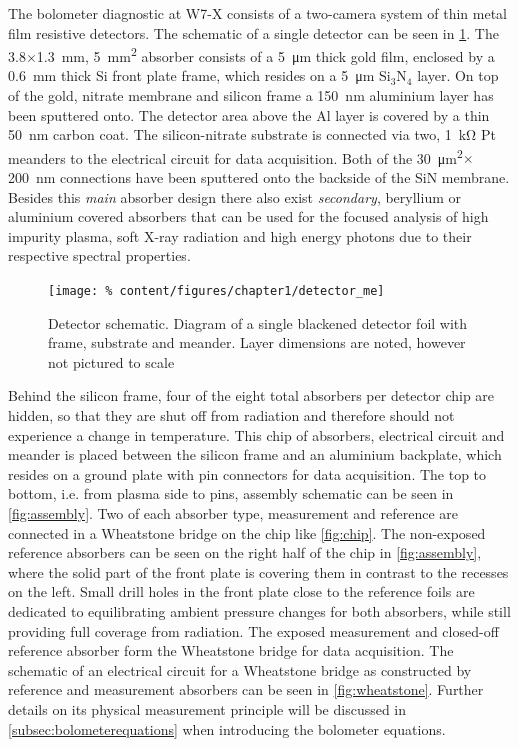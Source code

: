             The bolometer diagnostic at W7-X consists of a two-camera system of thin metal film resistive detectors. The schematic of a single detector can be seen in \cref{fig:detector_me}. The 3.8$\times$\SI{1.3}{\milli\meter}, \SI{5}{\milli\meter\squared} absorber consists of a \mbox{\SI{5}{\micro\meter}} thick gold film, enclosed by a \mbox{\SI{0.6}{\milli\meter}} thick Si front plate frame, which resides on a \mbox{\SI{5}{\micro\meter}} Si$_{3}$N$_{4}$ layer. On top of the gold, nitrate membrane and silicon frame a \mbox{\SI{150}{\nano\meter}} aluminium layer has been sputtered onto. The detector area above the Al layer is covered by a thin \mbox{\SI{50}{\nano\meter}} carbon coat. The silicon-nitrate substrate is connected via two, \mbox{\SI{1}{\kilo\ohm}} Pt meanders to the electrical circuit for data acquisition. Both of the \mbox{\SI{30}{\micro\meter\squared}$\times$\SI{200}{\nano\meter}} connections have been sputtered onto the backside of the SiN membrane. Besides this \textit{main} absorber design there also exist \textit{secondary}, beryllium or aluminium covered absorbers that can be used for the focused analysis of high impurity plasma, soft X-ray radiation and high energy photons due to their respective spectral properties.\\%
%
            \begin{figure}[t]%
                \centering%
                \texttt{[image: \%
                    content/figures/chapter1/detector\_me]}%
                \caption{%
                    Detector schematic. Diagram of a single blackened detector foil with frame, substrate and meander. Layer dimensions are noted, however not pictured to scale}\label{fig:detector_me}%
            \end{figure}%
%
            Behind the silicon frame, four of the eight total absorbers per detector chip are hidden, so that they are shut off from radiation and therefore should not experience a change in temperature. This chip of absorbers, electrical circuit and meander is placed between the silicon frame and an aluminium backplate, which resides on a ground plate with pin connectors for data acquisition. The top to bottom, i.e. from plasma side to pins, assembly schematic can be seen in \cref{fig:assembly}. Two of each absorber type, measurement and reference are connected in a Wheatstone bridge on the chip like \cref{fig:chip}. The non-exposed reference absorbers can be seen on the right half of the chip in \cref{fig:assembly}, where the solid part of the front plate is covering them in contrast to the recesses on the left. Small drill holes in the front plate close to the reference foils are dedicated to equilibrating ambient pressure changes for both absorbers, while still providing full coverage from radiation. The exposed measurement and closed-off reference absorber form the Wheatstone bridge for data acquisition. The schematic of an electrical circuit for a Wheatstone bridge as constructed by reference and measurement absorbers can be seen in \cref{fig:wheatstone}. Further details on its physical measurement principle will be discussed in \cref{subsec:bolometerequations} when introducing the bolometer equations.\\%
